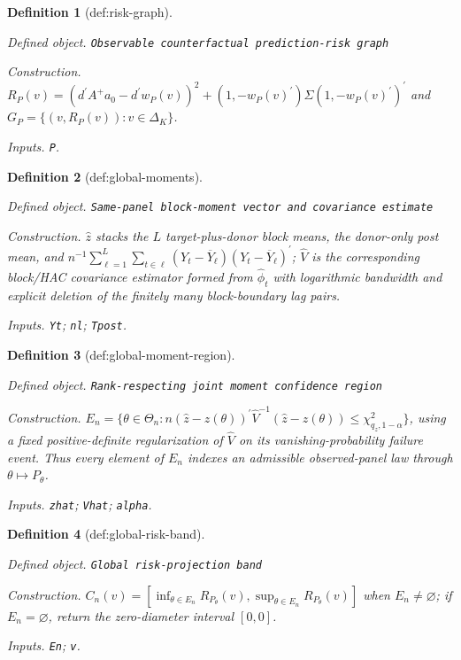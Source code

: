 \documentclass{article}
\newtheorem{definition}{Definition}
\begin{document}
\begin{definition}[def:risk-graph]\label{def:risk-graph}
\par\smallskip\noindent\emph{Defined object.} \texttt{Observable counterfactual prediction-\allowbreak{}risk graph}
\par\smallskip\noindent\emph{Construction.} \(R_P(v)=(d^{\prime}A^+a_0-d^{\prime}w_P(v))^2+(1,-w_P(v)^{\prime})\Sigma(1,-w_P(v)^{\prime})^{\prime}\) and \(G_P=\{(v,R_P(v)):v\in\Delta_K\}\).
\par\smallskip\noindent\emph{Inputs.} \texttt{P}.
\end{definition}

\begin{definition}[def:global-moments]\label{def:global-moments}
\par\smallskip\noindent\emph{Defined object.} \texttt{Same-\allowbreak{}panel block-\allowbreak{}moment vector and covariance estimate}
\par\smallskip\noindent\emph{Construction.} \(\widehat z\) stacks the \(L\) target-plus-donor block means, the donor-only post mean, and \(n^{-1}\sum_{\ell=1}^{L}\sum_{t\in\ell}(Y_t-\overline Y_\ell)(Y_t-\overline Y_\ell)^{\prime}\); \(\widehat V\) is the corresponding block/HAC covariance estimator formed from \(\widehat\phi_t\) with logarithmic bandwidth and explicit deletion of the finitely many block-boundary lag pairs.
\par\smallskip\noindent\emph{Inputs.} \texttt{Yt}; \texttt{nl}; \texttt{Tpost}.
\end{definition}

\begin{definition}[def:global-moment-region]\label{def:global-moment-region}
\par\smallskip\noindent\emph{Defined object.} \texttt{Rank-\allowbreak{}respecting joint moment confidence region}
\par\smallskip\noindent\emph{Construction.} \(E_n=\{\theta\in\Theta_n:n(\widehat z-z(\theta))^{\prime}\widehat V^{-1}(\widehat z-z(\theta))\le\chi^2_{q_z,1-\alpha}\}\), using a fixed positive-definite regularization of \(\widehat V\) on its vanishing-probability failure event. Thus every element of \(E_n\) indexes an admissible observed-panel law through \(\theta\mapsto P_\theta\).
\par\smallskip\noindent\emph{Inputs.} \texttt{zhat}; \texttt{Vhat}; \texttt{alpha}.
\end{definition}

\begin{definition}[def:global-risk-band]\label{def:global-risk-band}
\par\smallskip\noindent\emph{Defined object.} \texttt{Global risk-\allowbreak{}projection band}
\par\smallskip\noindent\emph{Construction.} \(C_n(v)=[\inf_{\theta\in E_n}R_{P_\theta}(v),\sup_{\theta\in E_n}R_{P_\theta}(v)]\) when \(E_n\neq\varnothing\); if \(E_n=\varnothing\), return the zero-diameter interval \([0,0]\).
\par\smallskip\noindent\emph{Inputs.} \texttt{En}; \texttt{v}.
\end{definition}
\end{document}
